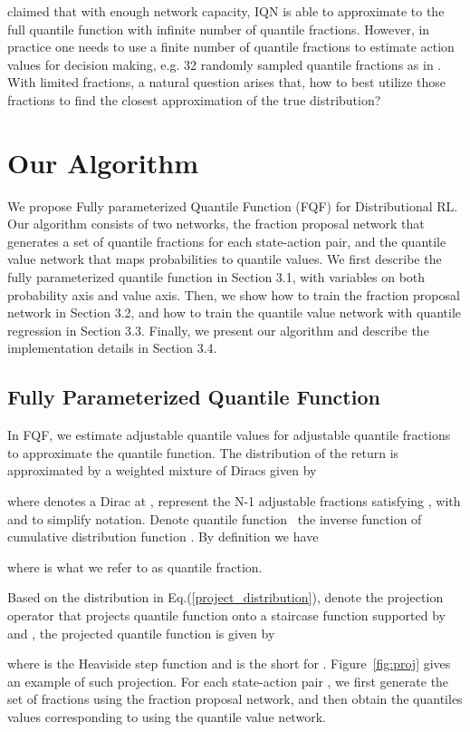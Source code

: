 \documentclass{article}
\begin{document}
\cite{dabney2018implicit} claimed that with enough network capacity, IQN is able to approximate to the full quantile function with infinite number of quantile fractions. However, in practice one needs to use a finite number of quantile fractions to estimate action values for decision making, e.g. 32 randomly sampled quantile fractions as in \cite{dabney2018implicit}. With limited fractions, a natural question arises that, how to best utilize those fractions to find the closest approximation of the true distribution?  


\section{Our Algorithm}
We propose Fully parameterized Quantile Function (FQF) for Distributional RL. Our algorithm consists of two networks, the fraction proposal network that generates a set of quantile fractions for each state-action pair, and the quantile value network that maps probabilities to quantile values. We first describe the fully parameterized quantile function in Section 3.1, with variables on both probability axis and value axis. Then, we show how to train the fraction proposal network in Section 3.2, and how to train the quantile value network with quantile regression in Section 3.3. Finally, we present our algorithm and describe the implementation details in Section 3.4. 

\subsection{Fully Parameterized Quantile Function}
In FQF, we estimate  adjustable quantile values for  adjustable quantile fractions to approximate the quantile function. The distribution of the return is approximated by a weighted mixture of  Diracs given by

where  denotes a Dirac at ,  represent the N-1 adjustable fractions satisfying , with  and  to simplify notation. Denote quantile function~\citep{muller1997integral}  the inverse function of cumulative distribution function . By definition we have

where  is what we refer to as quantile fraction.

Based on the distribution in Eq.(\ref{project_distribution}), denote  the projection operator that projects quantile function onto a staircase function supported by  and , the projected quantile function is given by

where  is the Heaviside step function and  is the short for . Figure~\ref{fig:proj} gives an example of such projection. For each state-action pair , we first generate the set of fractions  using the fraction proposal network, and then obtain the quantiles values  corresponding to  using the quantile value network. 
\end{document}
